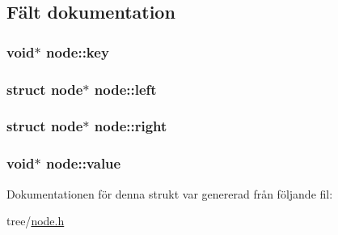 \subsection{Fält dokumentation}
\hypertarget{structnode_a72c8a0c41b801c92db89c5078642f28b}{
\subsubsection[{key}]{\setlength{\rightskip}{0pt plus 5cm}void$\ast$ node\+::key}}\label{structnode_a72c8a0c41b801c92db89c5078642f28b}
\hypertarget{structnode_a3ce38490a651bfda86d88ff955e96abc}{
\subsubsection[{left}]{\setlength{\rightskip}{0pt plus 5cm}struct {\bf node}$\ast$ node\+::left}}\label{structnode_a3ce38490a651bfda86d88ff955e96abc}
\hypertarget{structnode_a875f75abfe22103500535b179828e4e3}{
\subsubsection[{right}]{\setlength{\rightskip}{0pt plus 5cm}struct {\bf node}$\ast$ node\+::right}}\label{structnode_a875f75abfe22103500535b179828e4e3}
\hypertarget{structnode_a288a44aecd04d7839824d50a0b65982e}{
\subsubsection[{value}]{\setlength{\rightskip}{0pt plus 5cm}void$\ast$ node\+::value}}\label{structnode_a288a44aecd04d7839824d50a0b65982e}


Dokumentationen för denna strukt var genererad från följande fil\+:\begin{DoxyCompactItemize}
\item 
tree/\hyperlink{node_8h}{node.\+h}\end{DoxyCompactItemize}
